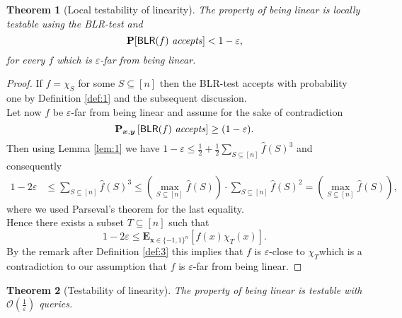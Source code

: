 \documentclass[a4paper]{article}
\newcommand{\prob}{\mathbf{P}}
\newcommand{\expe}{\mathbf{E}}
\newcommand{\nset}{[n]}
\newcommand{\eps}{\varepsilon}
\newcommand{\boldx}{\boldsymbol{x}}
\newcommand{\boldy}{\boldsymbol{y}}
\theoremstyle{plain}
\newtheorem{theorem}{Theorem}
\theoremstyle{definition}
\theoremstyle{remark}
\begin{document}
\begin{theorem}[Local testability of linearity] \label{thm:1}
  The property of being linear is locally testable using the
  \textsf{BLR}-test and 
  \[\prob[\textsf{BLR}(f) \text{ \textit{accepts}}] < 1 - \eps,\]
  for every \(f\) which is \(\eps\)-far from being linear. 
\end{theorem}

\begin{proof}
  If \(f = \chi_S\) for some \(S\subseteq \nset\) then the
  \textsf{BLR}-test accepts with probability one by Definition
  \ref{def:1} and the subsequent discussion.\\ 
  Let now \(f\) be \(\eps\)-far from being linear and assume for the
  sake of contradiction 
  \[\prob_{\boldx,\boldy}\left[\textsf{BLR}(f) \text{ \textit{accepts}}\right] \geq
  (1-\eps). \]
  Then using Lemma \ref{lem:1} we have \(1-\eps \leq \frac{1}{2} +
  \frac{1}{2} \sum_{S\subseteq \nset}\hat{f}(S)^3\) and consequently
  \begin{align}
    1 - 2\eps &\leq \sum_{S\subseteq \nset}\hat{f}(S)^3 \leq \left(\max_{S\subseteq \nset} \hat{f}(S)\right)\cdot \sum_{S\subseteq \nset}\hat{f}(S)^2 = \left(\max_{S\subseteq \nset} \hat{f}(S)\right),  \label{al:1}
  \end{align}
  where we used Parseval's theorem for the last equality. \\
  Hence there exists a subset \(T \subseteq \nset\) such that 
  \[1 - 2\eps \leq \expe_{\boldx\in\{-1,1\}^n}\left[f(x)\chi_T(x)\right].\]
  By the remark after Definition \ref{def:3} this implies that \(f\)
  is \(\eps\)-close to \(\chi_T\)which is a contradiction to our
  assumption that \(f\) is \(\eps\)-far from being linear. 
\end{proof}

\begin{theorem}[Testability of linearity] \label{thm:2}
  The property of being linear is testable with
  \(\mathcal{O}\left(\frac{1}{\eps}\right)\) queries. 
\end{theorem}
\end{document}
